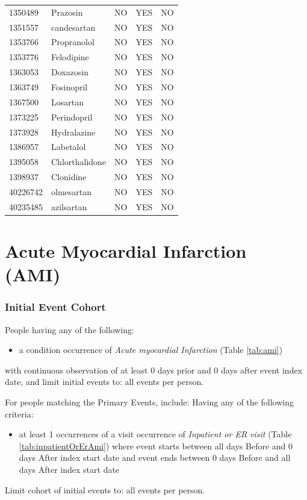 \documentclass[11pt]{book}
\providecommand{\tightlist}{%
  \setlength{\itemsep}{0pt}\setlength{\parskip}{0pt}}
\theoremstyle{definition}
\theoremstyle{definition}
\theoremstyle{definition}
\theoremstyle{remark}
\begin{document}
\begin{longtable}[]{@{}lllll@{}}
1350489 & Prazosin & NO & YES & NO\tabularnewline
1351557 & candesartan & NO & YES & NO\tabularnewline
1353766 & Propranolol & NO & YES & NO\tabularnewline
1353776 & Felodipine & NO & YES & NO\tabularnewline
1363053 & Doxazosin & NO & YES & NO\tabularnewline
1363749 & Fosinopril & NO & YES & NO\tabularnewline
1367500 & Losartan & NO & YES & NO\tabularnewline
1373225 & Perindopril & NO & YES & NO\tabularnewline
1373928 & Hydralazine & NO & YES & NO\tabularnewline
1386957 & Labetalol & NO & YES & NO\tabularnewline
1395058 & Chlorthalidone & NO & YES & NO\tabularnewline
1398937 & Clonidine & NO & YES & NO\tabularnewline
40226742 & olmesartan & NO & YES & NO\tabularnewline
40235485 & azilsartan & NO & YES & NO\tabularnewline
\bottomrule
\end{longtable}

\section{Acute Myocardial Infarction (AMI)}\label{Ami}

\subsubsection*{Initial Event Cohort}\label{initial-event-cohort-2}

People having any of the following:

\begin{itemize}
\tightlist
\item
  a condition occurrence of \emph{Acute myocardial Infarction} (Table
  \ref{tab:ami})
\end{itemize}

with continuous observation of at least 0 days prior and 0 days after
event index date, and limit initial events to: all events per person.

For people matching the Primary Events, include: Having any of the
following criteria:

\begin{itemize}
\tightlist
\item
  at least 1 occurrences of a visit occurrence of \emph{Inpatient or ER
  visit} (Table \ref{tab:inpatientOrErAmi}) where event starts between
  all days Before and 0 days After index start date and event ends
  between 0 days Before and all days After index start date
\end{itemize}

Limit cohort of initial events to: all events per person.
\end{document}
